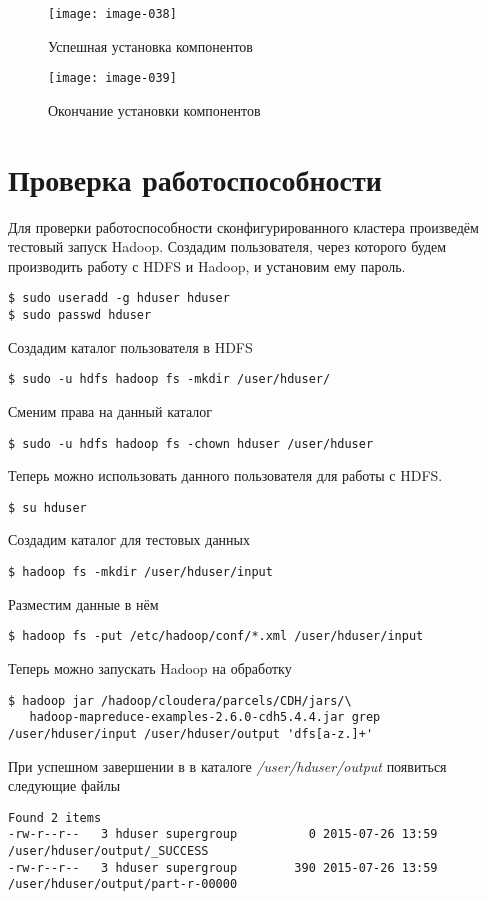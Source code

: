 \newpage

\begin{figure}[ht!]
    \center
    \texttt{[image: image-038]}
    \caption{Успешная установка компонентов}
    \texttt{[image: image-039]}
    \caption{Окончание установки компонентов}
\end{figure}

\newpage

\section{Проверка работоспособности}
Для проверки работоспособности сконфигурированного кластера произведём тестовый запуск Hadoop. 
Создадим пользователя, через которого будем производить работу с HDFS и Hadoop, и установим ему пароль.
\begin{lstlisting}
$ sudo useradd -g hduser hduser
$ sudo passwd hduser
\end{lstlisting}
Создадим каталог пользователя в HDFS
\begin{lstlisting}
$ sudo -u hdfs hadoop fs -mkdir /user/hduser/
\end{lstlisting}
Сменим права на данный каталог
\begin{lstlisting}
$ sudo -u hdfs hadoop fs -chown hduser /user/hduser
\end{lstlisting}
Теперь можно использовать данного пользователя для работы с HDFS.
\begin{lstlisting}
$ su hduser
\end{lstlisting}
Создадим каталог для тестовых данных
\begin{lstlisting}
$ hadoop fs -mkdir /user/hduser/input
\end{lstlisting}
Разместим данные в нём
\begin{lstlisting}
$ hadoop fs -put /etc/hadoop/conf/*.xml /user/hduser/input 
\end{lstlisting}
Теперь можно запускать Hadoop на обработку
\begin{lstlisting}
$ hadoop jar /hadoop/cloudera/parcels/CDH/jars/\
   hadoop-mapreduce-examples-2.6.0-cdh5.4.4.jar grep /user/hduser/input /user/hduser/output 'dfs[a-z.]+'
\end{lstlisting}
При успешном завершении в в каталоге \emph{/user/hduser/output} появиться следующие файлы
\begin{lstlisting}
Found 2 items
-rw-r--r--   3 hduser supergroup          0 2015-07-26 13:59 /user/hduser/output/_SUCCESS
-rw-r--r--   3 hduser supergroup        390 2015-07-26 13:59 /user/hduser/output/part-r-00000
\end{lstlisting}
